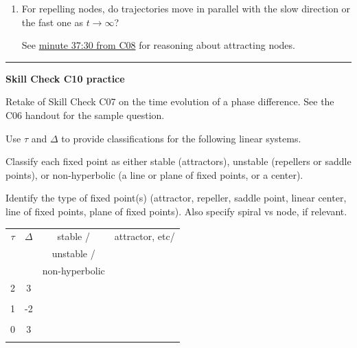 \documentclass[12pt,letterpaper,noanswers]{exam}
\begin{document}
\begin{enumerate}
\item For repelling nodes, do trajectories move in parallel with the slow direction or the fast one as $t \rightarrow \infty$?

See {\color{blue}  \href{https://harvard.zoom.us/rec/play/lX1ny4yNnMY6JJHgyRA7oOCTstSUGg_nz8JoeiFCVCyR54jITe-WA-D0mhz-z3fkm7QOWwXl53OYOm1Q.rRkoIFXuq3kkTMa1}{minute 37:30 from C08}} for reasoning about attracting nodes.  

\end{enumerate}
\vspace{0.2cm}

\hrule
\vspace{0.2cm}

\noindent\textbf{Skill Check C10 practice}
\begin{questions}

\item Retake of Skill Check C07 on the time evolution of a phase difference.  See the C06 handout for the sample question.

\item Use $\tau$ and $\Delta$ to provide classifications for the following linear systems.  
\begin{parts}
\item Classify each fixed point as either stable (attractors), unstable (repellers or saddle points), or non-hyperbolic (a line or plane of fixed points, or a center). 
\item Identify the type of fixed point(s) (attractor, repeller, saddle point, linear center, line of fixed points, plane of fixed points).  Also specify spiral vs node, if relevant.
\end{parts} 

\begin{tabular}{|c|c|c|c|}
\hline
$\tau$ & $\Delta$ & stable / & attractor, etc/ \\
& & unstable / &  \\
& & non-hyperbolic & \\
\hline
2 & 3 & & \\
&  & & \\
\hline
 1    &  -2& & \\
     & & & \\
     \hline
 0  & 3 & & \\
     & & & \\
     \hline
\end{tabular}
\end{questions}

\vspace{0.2cm}
\end{document}
